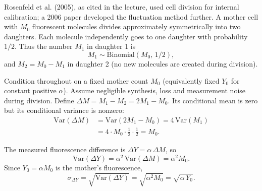 Rosenfeld et al. (2005), as cited in the lecture, used cell division for internal calibration; a 2006 paper developed the fluctuation method further. A mother cell with $M_0$ fluorescent molecules divides approximately symmetrically into two daughters. Each molecule independently goes to one daughter with probability $1/2$. Thus the number $M_1$ in daughter 1 is
\begin{equation}\label{eq:lecture03-m1-binomial}
M_1 \sim \mathrm{Binomial}(M_0,\,1/2),
\end{equation}
and $M_2 = M_0 - M_1$ in daughter 2 (no new molecules are created during division).

Condition throughout on a fixed mother count $M_0$ (equivalently fixed $Y_0$ for constant positive $\alpha$). Assume negligible synthesis, loss and measurement noise during division. Define $\Delta M=M_1-M_2=2M_1-M_0$. Its conditional mean is zero but its conditional variance is nonzero:
\begin{align}\label{eq:lecture03-deltaM-var}
\mathrm{Var}(\Delta M)
&= \mathrm{Var}(2M_1 - M_0)
= 4\,\mathrm{Var}(M_1)   \\
&= 4 \cdot M_0 \cdot \tfrac12 \cdot \tfrac12
= M_0 .
\end{align}

The measured fluorescence difference is $\Delta Y = \alpha\,\Delta M$, so
\begin{equation}\label{eq:lecture03-deltaY-var}
\mathrm{Var}(\Delta Y) = \alpha^{2}\,\mathrm{Var}(\Delta M) = \alpha^{2} M_0 .
\end{equation}
Since $Y_0 = \alpha M_0$ is the mother's fluorescence,
\begin{equation}\label{eq:lecture03-sigma-deltaY}
\sigma_{\Delta Y} = \sqrt{\mathrm{Var}(\Delta Y)} = \sqrt{\alpha^{2} M_0} = \sqrt{\alpha\,Y_0} .
\end{equation}

